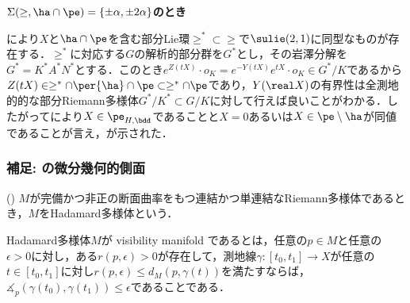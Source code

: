 \begin{npfwn}[\Cref{thm:1216-main}]


  
  \textbf{$\Sigma(\ge,\ha\cap\pe) = \{\pm\alpha,\pm 2\alpha \}$のとき}

  により$X$と$\ha \cap\pe$を含む部分Lie環$\ge^* \subset \ge $で$\sulie(2,1) $に同型なものが存在する．$\ge^* $に対応する$G$の解析的部分群を$G^* $とし，その岩澤分解を$G^* = K^*A^*N^* $とする．このとき$e^{Z(t X)}\cdot o_K = e^{-Y(tX)}e^{tX}\cdot o_K\in G^*/K $であるから$Z(tX)\in \ge^* \cap \per{\ha}\cap \pe\subset \ge^*\cap\pe $であり，$Y(\real X) $の有界性は全測地的的な部分Riemann多様体$G^*/K^* \subset G/K$に対して行えば良いことがわかる．したがってにより$X\in\pe_{H,\bdd}$であることと$ X = 0 $あるいは$X\in \pe\setminus\ha $が同値であることが言え，が示された．
\end{npfwn}

    
    



\subsubsection{補足: の微分幾何的側面}
\begin{defi}({\cite[Definition~1.3]{e72-1}})\label{def:visibility}
  $M$が完備かつ非正の断面曲率をもつ連結かつ単連結なRiemann多様体であるとき，$M$をHadamard多様体という．

  Hadamard多様体$M$が visibility manifold であるとは，任意の$ p\in M$と任意の$ \epsilon > 0$に対し，ある$r(p,\epsilon) >0 $が存在して，測地線$\gamma\colon [t_0, t_1]\to X $が任意の$ t\in [t_0, t_1]$に対し$r(p,\epsilon) \leq d_{M}(p, \gamma(t))$を満たすならば，$\measuredangle_{p}(\gamma(t_0), \gamma(t_1)) \leq \epsilon $であることである．
\end{defi}

